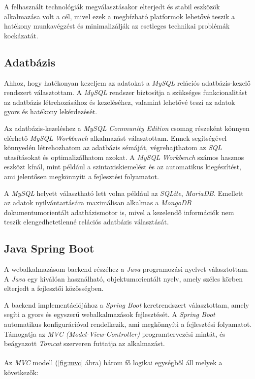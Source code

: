 
A felhasznált technológiák megválasztásakor elterjedt és stabil eszközök alkalmazása volt a cél, mivel ezek a megbízható platformok lehetővé teszik a hatékony munkavégzést és minimalizálják az esetleges technikai problémák kockázatát.


\subsection{Adatbázis}

Ahhoz, hogy hatékonyan kezeljem az adatokat a \textit{MySQL} \cite{MySQL} relációs adatbázis-kezelő rendszert választottam. A \textit{MySQL} rendszer biztosítja a szükséges funkcionalitást az adatbázis létrehozásához és kezeléséhez, valamint lehetővé teszi az adatok gyors és hatékony lekérdezését.

Az adatbázis-kezeléshez a \textit{MySQL Community Edition} \cite{MySQL Community Edition} csomag részeként könnyen elérhető \textit{MySQL Workbench} \cite{MySQL_Workbench} alkalmazást választottam. Ennek segítségével könnyedén létrehozhatom az adatbázis sémáját, végrehajthatom az \textit{SQL} \cite{SQL} utasításokat és optimalizálhatom azokat. A \textit{MySQL Workbench} számos hasznos eszközt kínál, mint például a szintaxiskiemelést és az automatikus kiegészítést, ami jelentősen megkönnyíti a fejlesztési folyamatot.

A \textit{MySQL} helyett választható lett volna például az \textit{SQLite}, \textit{MariaDB}. Emellett az adatok nyilvántartására maximálisan alkalmas a \textit{MongoDB} dokumentumorientált adatbázismotor is, mivel a kezelendő információk nem teszik elengedhetetlenné relációs adatbázis választását.


\subsection{Java Spring Boot}

A webalkalmazásom backend részéhez a \textit{Java} \cite{java} programozási nyelvet választottam. A \textit{Java} egy kiválóan használható, objektumorientált nyelv, amely széles körben elterjedt a fejlesztői közösségben.

A backend implementációjához a \textit{Spring Boot} \cite{spring_boot} keretrendszert választottam, amely segíti a gyors és egyszerű webalkalmazások fejlesztését. A \textit{Spring Boot} automatikus konfigurációval rendelkezik, ami megkönnyíti a fejlesztési folyamatot. Támogatja az \textit{MVC (Model-View-Controller)} \cite{mvc} programtervezési mintát, és beágyazott \textit{Tomcat} \cite{Tomcat} szerveren futtatja az alkalmazást.\\ 
\\
Az \textit{MVC} modell (\ref{fig:mvc} ábra) három fő logikai egységből áll melyek a következők:

